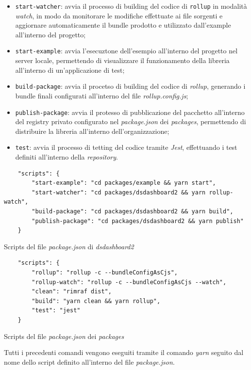 \begin{itemize}
    \item \texttt{start-watcher}: avvia il processo di building del codice di \texttt{rollup} in modalità \textit{watch}, in modo da monitorare le modifiche effettuate
          ai file sorgenti e aggiornare automaticamente il bundle prodotto e utilizzato dall'example all'interno del progetto;
    \item \texttt{start-example}: avvia l'esecuztone dell'esempio all'interno del progetto nel server locale, permettendo di visualizzare il funzionamento della libreria
          all'interno di un'applicazione di test;
    \item \texttt{build-package}: avvia il procetso di building del codice di \textit{rollup}, generando i bundle finali configurati all'interno del file \textit{rollup.config.js};
    \item \texttt{publish-package}: avvia il protesso di pubblicazione del pacchetto all'interno del registry privato configurato nel \textit{package.json} dei \textit{packages}, permettendo
          di distribuire la libreria all'interno dell'organizzazione;
    \item \texttt{test}: avvia il processo di tetting del codice tramite \textit{Jest}, effettuando i test definiti all'interno della \textit{repository}.
\end{itemize}
\begin{listing}[H]
    \begin{verbatim}
    "scripts": {
        "start-example": "cd packages/example && yarn start",
        "start-watcher": "cd packages/dsdashboard2 && yarn rollup-watch",
        "build-package": "cd packages/dsdashboard2 && yarn build",
        "publish-package": "cd packages/dsdashboard2 && yarn publish"
    }
    \end{verbatim}
    \caption{Scripts del file \textit{package.json} di \textit{dsdashboard2}}
    \label{listing:scripts_package_json_dsdashboard2}
\end{listing}

\begin{listing}[H]
    \begin{verbatim}
    "scripts": {
        "rollup": "rollup -c --bundleConfigAsCjs",
        "rollup-watch": "rollup -c --bundleConfigAsCjs --watch",
        "clean": "rimraf dist",
        "build": "yarn clean && yarn rollup",
        "test": "jest"
    }
    \end{verbatim}
    \caption{Scripts del file \textit{package.json} dei \textit{packages}}
    \label{listing:scripts_package_json_packages}
\end{listing}
Tutti i precedenti comandi vengono eseguiti tramite il comando \textit{yarn} seguito dal nome dello script definito all'interno del file \textit{package.json}.


